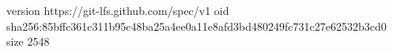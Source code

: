 version https://git-lfs.github.com/spec/v1
oid sha256:85bffc361c311b95c48ba25a4ee0a11e8afd3bd480249fc731c27e62532b3cd0
size 2548
